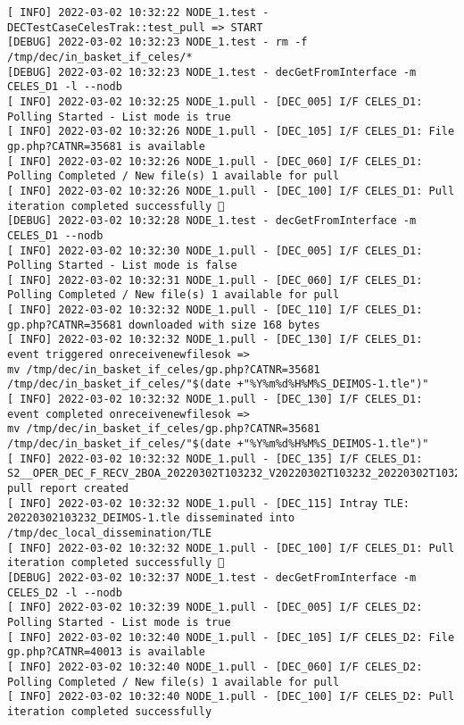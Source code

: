 \documentclass[dec_sum_main.tex]{subfiles}
\begin{document}
 \newline

\begin{Verbatim}[fontsize=\tiny]
[ INFO] 2022-03-02 10:32:22 NODE_1.test - DECTestCaseCelesTrak::test_pull => START
[DEBUG] 2022-03-02 10:32:23 NODE_1.test - rm -f /tmp/dec/in_basket_if_celes/*
[DEBUG] 2022-03-02 10:32:23 NODE_1.test - decGetFromInterface -m CELES_D1 -l --nodb
[ INFO] 2022-03-02 10:32:25 NODE_1.pull - [DEC_005] I/F CELES_D1: Polling Started - List mode is true
[ INFO] 2022-03-02 10:32:26 NODE_1.pull - [DEC_105] I/F CELES_D1: File gp.php?CATNR=35681 is available
[ INFO] 2022-03-02 10:32:26 NODE_1.pull - [DEC_060] I/F CELES_D1: Polling Completed / New file(s) 1 available for pull
[ INFO] 2022-03-02 10:32:26 NODE_1.pull - [DEC_100] I/F CELES_D1: Pull iteration completed successfully 🕺
[DEBUG] 2022-03-02 10:32:28 NODE_1.test - decGetFromInterface -m CELES_D1 --nodb
[ INFO] 2022-03-02 10:32:30 NODE_1.pull - [DEC_005] I/F CELES_D1: Polling Started - List mode is false
[ INFO] 2022-03-02 10:32:31 NODE_1.pull - [DEC_060] I/F CELES_D1: Polling Completed / New file(s) 1 available for pull
[ INFO] 2022-03-02 10:32:32 NODE_1.pull - [DEC_110] I/F CELES_D1: gp.php?CATNR=35681 downloaded with size 168 bytes
[ INFO] 2022-03-02 10:32:32 NODE_1.pull - [DEC_130] I/F CELES_D1: event triggered onreceivenewfilesok => 
mv /tmp/dec/in_basket_if_celes/gp.php?CATNR=35681 /tmp/dec/in_basket_if_celes/"$(date +"%Y%m%d%H%M%S_DEIMOS-1.tle")"
[ INFO] 2022-03-02 10:32:32 NODE_1.pull - [DEC_130] I/F CELES_D1: event completed onreceivenewfilesok => 
mv /tmp/dec/in_basket_if_celes/gp.php?CATNR=35681 /tmp/dec/in_basket_if_celes/"$(date +"%Y%m%d%H%M%S_DEIMOS-1.tle")"
[ INFO] 2022-03-02 10:32:32 NODE_1.pull - [DEC_135] I/F CELES_D1: S2__OPER_DEC_F_RECV_2BOA_20220302T103232_V20220302T103232_20220302T103232_CELES_D1.xml pull report created
[ INFO] 2022-03-02 10:32:32 NODE_1.pull - [DEC_115] Intray TLE: 20220302103232_DEIMOS-1.tle disseminated into /tmp/dec_local_dissemination/TLE
[ INFO] 2022-03-02 10:32:32 NODE_1.pull - [DEC_100] I/F CELES_D1: Pull iteration completed successfully 🕺
[DEBUG] 2022-03-02 10:32:37 NODE_1.test - decGetFromInterface -m CELES_D2 -l --nodb
[ INFO] 2022-03-02 10:32:39 NODE_1.pull - [DEC_005] I/F CELES_D2: Polling Started - List mode is true
[ INFO] 2022-03-02 10:32:40 NODE_1.pull - [DEC_105] I/F CELES_D2: File gp.php?CATNR=40013 is available
[ INFO] 2022-03-02 10:32:40 NODE_1.pull - [DEC_060] I/F CELES_D2: Polling Completed / New file(s) 1 available for pull
[ INFO] 2022-03-02 10:32:40 NODE_1.pull - [DEC_100] I/F CELES_D2: Pull iteration completed successfully

\end{Verbatim}
\end{document}
